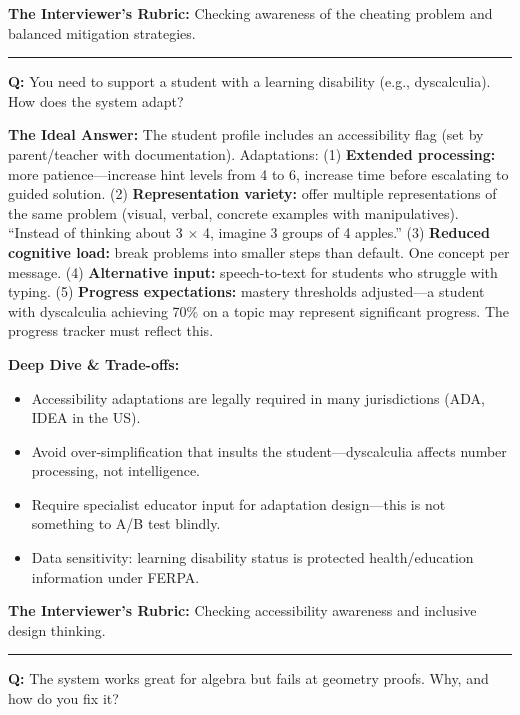 \textbf{The Interviewer's Rubric:} Checking awareness of the cheating problem and balanced mitigation strategies.

\bigskip\hrule\bigskip

\textbf{Q:} You need to support a student with a learning disability (e.g., dyscalculia). How does the system adapt?

\textbf{The Ideal Answer:} The student profile includes an accessibility flag (set by parent/teacher with documentation). Adaptations: (1) \textbf{Extended processing:} more patience---increase hint levels from 4 to 6, increase time before escalating to guided solution. (2) \textbf{Representation variety:} offer multiple representations of the same problem (visual, verbal, concrete examples with manipulatives). ``Instead of thinking about 3 $\times$ 4, imagine 3 groups of 4 apples.'' (3) \textbf{Reduced cognitive load:} break problems into smaller steps than default. One concept per message. (4) \textbf{Alternative input:} speech-to-text for students who struggle with typing. (5) \textbf{Progress expectations:} mastery thresholds adjusted---a student with dyscalculia achieving 70\% on a topic may represent significant progress. The progress tracker must reflect this.

\textbf{Deep Dive \& Trade-offs:}
\begin{itemize}
  \item Accessibility adaptations are legally required in many jurisdictions (ADA, IDEA in the US).
  \item Avoid over-simplification that insults the student---dyscalculia affects number processing, not intelligence.
  \item Require specialist educator input for adaptation design---this is not something to A/B test blindly.
  \item Data sensitivity: learning disability status is protected health/education information under FERPA.
\end{itemize}

\textbf{The Interviewer's Rubric:} Checking accessibility awareness and inclusive design thinking.

\bigskip\hrule\bigskip

\textbf{Q:} The system works great for algebra but fails at geometry proofs. Why, and how do you fix it?

